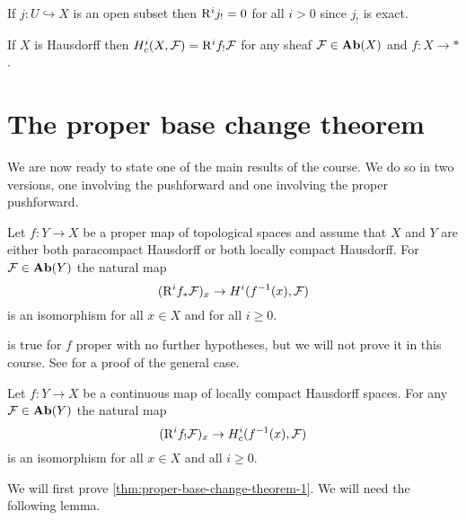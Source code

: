 \begin{exmp}
	If $j\colon U \hookrightarrow X$ is an open subset then $\mathrm{R}^ij_! = 0$ for all $i > 0$ since $j_!$ is exact.
\end{exmp}

\begin{exc}\label{exc:compactly-supported-cohomology-higher-proper-pushforward-to-point}
	If $X$ is Hausdorff then $\cohomology^i_c(X, \sh{F}) = \rightderived^i f_!\sh{F}$ for any sheaf $\mathcal{F} \in \operatorname{\mathbf{Ab}}(X)$ and $f\colon X \to *$.
\end{exc}

\section{The proper base change theorem}
\noindent
We are now ready to state one of the main results of the course. We do so in two versions, one involving the pushforward and one involving the proper pushforward.

\begin{thm}\label{thm:proper-base-change-theorem-1}
	Let $f\colon Y \to X$ be a proper map of topological spaces and assume that $X$ and $Y$ are either both paracompact Hausdorff or both locally compact Hausdorff. For $\mathcal{F} \in \operatorname{\mathbf{Ab}}(Y)$ the natural map \[
    	(\rightderived^i f_* \sh{F})_x \to \cohomology^i(f^{-1}(x), \sh{F})
    \] is an isomorphism for all $x \in X$ and for all $i \geq 0$.
\end{thm}

\begin{rmk}
	 is true for $f$ proper with no further hypotheses, but we will not prove it in this course. See \cite[Lemma~\textsc{09v6}]{stacks-project} for a proof of the general case.
\end{rmk}

\begin{thm}\label{thm:proper-base-changed-theorem-2}
	Let $f\colon Y \to X$ be a continuous map of locally compact Hausdorff spaces. For any $\mathcal{F} \in \operatorname{\mathbf{Ab}}(Y)$ the natural map \[
    	(\rightderived^i f_! \sh{F})_x \to \cohomology^i_c(f^{-1}(x), \sh{F})
    \] is an isomorphism for all $x \in X$ and all $i \geq 0$.
\end{thm}

We will first prove \cref{thm:proper-base-change-theorem-1}. We will need the following lemma.


